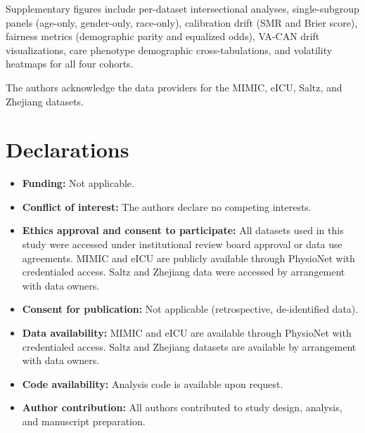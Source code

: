 \documentclass[pdflatex,sn-mathphys-num]{sn-jnl}
\theoremstyle{thmstyleone}%
\theoremstyle{thmstyletwo}%
\theoremstyle{thmstylethree}%
\begin{document}
\backmatter


Supplementary figures include per-dataset intersectional analyses, single-subgroup panels (age-only, gender-only, race-only), calibration drift (SMR and Brier score), fairness metrics (demographic parity and equalized odds), VA-CAN drift visualizations, care phenotype demographic cross-tabulations, and volatility heatmaps for all four cohorts.


The authors acknowledge the data providers for the MIMIC, eICU, Saltz, and Zhejiang datasets.

\section*{Declarations}

\begin{itemize}
\item \textbf{Funding:} Not applicable.
\item \textbf{Conflict of interest:} The authors declare no competing interests.
\item \textbf{Ethics approval and consent to participate:} All datasets used in this study were accessed under institutional review board approval or data use agreements. MIMIC and eICU are publicly available through PhysioNet with credentialed access. Saltz and Zhejiang data were accessed by arrangement with data owners.
\item \textbf{Consent for publication:} Not applicable (retrospective, de-identified data).
\item \textbf{Data availability:} MIMIC and eICU are available through PhysioNet with credentialed access. Saltz and Zhejiang datasets are available by arrangement with data owners.
\item \textbf{Code availability:} Analysis code is available upon request.
\item \textbf{Author contribution:} All authors contributed to study design, analysis, and manuscript preparation.
\end{itemize}
\end{document}
